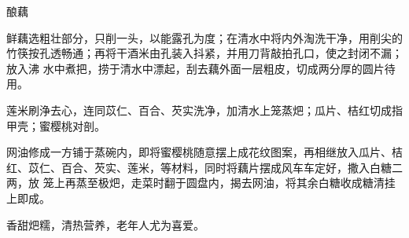 \begin{recipe}[八宝酿藕]{酿藕}

\ingredients


\preparation

\step 鲜藕选粗壮部分，只削一头，以能露孔为度；在清水中将内外淘洗干净，用削尖的
竹筷按孔透畅通；再将干酒米由孔装入抖紧，并用刀背敲拍孔口，使之封闭不漏；放入沸
水中煮把，捞于清水中漂起，刮去藕外面一层粗皮，切成两分厚的圆片待用。

\step 莲米刷浄去心，连同苡仁、百合、芡实洗净，加清水上笼蒸𤆵；瓜片、桔红切成指
甲壳；蜜樱桃对剖。

\step 网油修成一方铺于蒸碗内，即将蜜樱桃随意摆上成花纹图案，再相继放入瓜片、桔
红、苡仁、百合、芡实、莲米，等材料，同时将藕片摆成风车车定好，撒入白糖二两，放
笼上再蒸至极𤆵，走菜时翻于圆盘内，揭去网油，将其余白糖收成糖清挂上即成。

\features

香甜𤆵糯，清热营养，老年人尤为喜爱。

\end{recipe}

